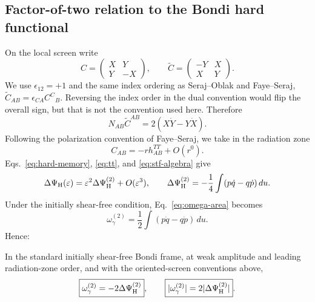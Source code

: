 \subsection{Factor-of-two relation to the Bondi hard functional}
On the local screen write
\[
C=\begin{pmatrix}X&Y\\Y&-X\end{pmatrix},\qquad
\widetilde C=\begin{pmatrix}-Y&X\\X&Y\end{pmatrix}.
\]
We use $\epsilon_{12}=+1$ and the same index ordering as Seraj--Oblak and Faye--Seraj,
$\widetilde C_{AB}=\epsilon_{CA}C^C{}_B$. Reversing the index order in the dual convention would flip the overall sign, but that is not the convention used here. Therefore
\begin{equation}
N_{AB}\widetilde C^{AB}=2(X\dot Y-Y\dot X).
\label{eq:stf-algebra}
\end{equation}
Following the polarization convention of Faye--Seraj, we take in the radiation zone
\begin{equation}
C_{AB}=-r h^{TT}_{AB}+O(r^0).
\label{eq:shear-strain}
\end{equation}
Eqs.~\eqref{eq:hard-memory}, \eqref{eq:tt}, and \eqref{eq:stf-algebra} give
\begin{equation}
\Delta\Psi_{\rm H}(\varepsilon)
=\varepsilon^2\Delta\Psi_{\rm H}^{(2)}+O(\varepsilon^3),
\qquad
\Delta\Psi_{\rm H}^{(2)}
=-\frac14\int(p\dot q-q\dot p)\,du.
\label{eq:gyro-area}
\end{equation}
Under the initially shear-free condition, Eq.~\eqref{eq:omega-area} becomes
\begin{equation}
\omega_\gamma^{(2)}=\frac12\int(p\dot q-q\dot p)\,du.
\label{eq:jacobi-area-eps}
\end{equation}
Hence:

\begin{theorem}
\label{thm:bridge}
In the standard initially shear-free Bondi frame, at weak amplitude and leading radiation-zone order, and with the oriented-screen conventions above,
\begin{equation}
\boxed{\omega_\gamma^{(2)}=-2\Delta\Psi_{\rm H}^{(2)}},\qquad
\boxed{|\omega_\gamma^{(2)}|=2|\Delta\Psi_{\rm H}^{(2)}|}.
\label{eq:bridge}
\end{equation}
\end{theorem}

